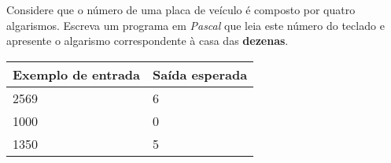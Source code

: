 \item Considere que o número de uma placa de veículo é composto por quatro
algarismos. Escreva um programa em \emph{Pascal} que leia este número  do
teclado e apresente o algarismo correspondente à casa das \textbf{dezenas}.

\begin{center}
\begin{tabular}{|l|l|} \hline
Exemplo de entrada & Saída esperada \\ \hline
2569                & 6               \\ \hline
1000                & 0               \\ \hline
1350                & 5               \\ \hline
\end{tabular}
\end{center}
